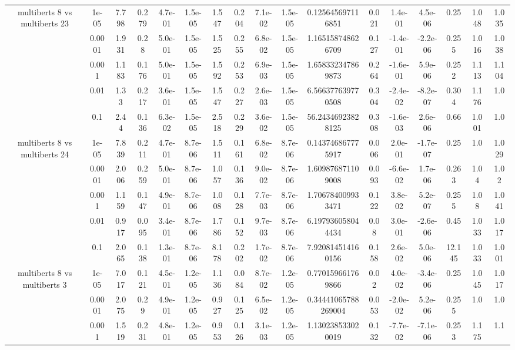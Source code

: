 \begin{tabular}{|c|c|c|c|c|c|c|c|c|c|c|c|c|c|c|c|c|}
\hline
\multirow{5}{*}{multiberts 8 vs multiberts 23} & 1e-05 & 7.798 & 0.279 & 4.7e-01 & 1.5e-05 & 1.547 & 0.204 & 7.1e-02 & 1.5e-05 & 0.125645697116851 & 0.021 & 1.4e-01 & 4.5e-06 & 0.25 & 1.048 & 1.035 \\
 & 0.0001 & 1.931 & 0.28 & 5.0e-01 & 1.5e-05 & 1.525 & 0.255 & 6.8e-02 & 1.5e-05 & 1.165158748626709 & 0.127 & -1.4e-01 & -2.2e-06 & 0.255 & 1.016 & 1.038 \\
 & 0.001 & 1.183 & 0.176 & 5.0e-01 & 1.5e-05 & 1.592 & 0.253 & 6.9e-03 & 1.5e-05 & 1.658332347869873 & 0.264 & -1.6e-01 & 5.9e-06 & 0.252 & 1.113 & 1.104 \\
 & 0.01 & 1.33 & 0.217 & 3.6e-01 & 1.5e-05 & 1.547 & 0.227 & 2.6e-03 & 1.5e-05 & 6.566377639770508 & 0.304 & -2.4e-02 & -8.2e-07 & 0.304 & 1.176 & 1.0 \\
 & 0.1 & 2.44 & 0.136 & 6.3e-02 & 1.5e-05 & 2.518 & 0.229 & 3.6e-02 & 1.5e-05 & 56.24346923828125 & 0.308 & -1.6e-03 & 2.6e-06 & 0.66 & 1.001 & 1.0 \\
\hline
\multirow{5}{*}{multiberts 8 vs multiberts 24} & 1e-05 & 7.839 & 0.211 & 4.7e-01 & 8.7e-06 & 1.511 & 0.161 & 6.8e-02 & 8.7e-06 & 0.143746867775917 & 0.006 & 2.0e-01 & -1.7e-07 & 0.25 & 1.0 & 1.029 \\
 & 0.0001 & 2.006 & 0.259 & 5.0e-01 & 8.7e-06 & 1.057 & 0.136 & 9.0e-02 & 8.7e-06 & 1.609876871109008 & 0.093 & -6.6e-02 & 1.7e-06 & 0.263 & 1.04 & 1.02 \\
 & 0.001 & 1.159 & 0.147 & 4.9e-01 & 8.7e-06 & 1.008 & 0.128 & 7.7e-03 & 8.7e-06 & 1.706784009933471 & 0.122 & 3.8e-02 & 5.2e-07 & 0.255 & 1.08 & 1.041 \\
 & 0.01 & 0.917 & 0.095 & 3.4e-01 & 8.7e-06 & 1.786 & 0.152 & 9.7e-03 & 8.7e-06 & 6.197936058044434 & 0.08 & 3.0e-01 & -2.6e-06 & 0.45 & 1.033 & 1.017 \\
 & 0.1 & 2.065 & 0.138 & 1.3e-01 & 8.7e-06 & 8.178 & 0.202 & 1.7e-02 & 8.7e-06 & 7.920814514160156 & 0.158 & 2.6e-02 & 5.0e-06 & 12.145 & 1.033 & 1.001 \\
\hline
\multirow{5}{*}{multiberts 8 vs multiberts 3} & 1e-05 & 7.017 & 0.121 & 4.5e-01 & 1.2e-05 & 1.136 & 0.084 & 8.7e-02 & 1.2e-05 & 0.770159661769866 & 0.02 & 4.0e-02 & -3.4e-06 & 0.25 & 1.045 & 1.017 \\
 & 0.0001 & 2.075 & 0.29 & 4.9e-01 & 1.2e-05 & 0.927 & 0.125 & 6.5e-02 & 1.2e-05 & 0.34441065788269004 & 0.053 & -2.0e-02 & 5.2e-06 & 0.255 & 1.0 & 1.0 \\
 & 0.001 & 1.519 & 0.231 & 4.8e-01 & 1.2e-05 & 0.953 & 0.126 & 3.1e-03 & 1.2e-05 & 1.130238533020019 & 0.132 & -7.7e-02 & -7.1e-06 & 0.253 & 1.175 & 1.1 \\

\end{tabular}
